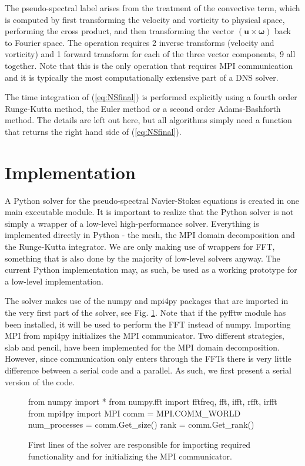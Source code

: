 \documentclass[11pt, oneside]{article}
\begin{document}
The pseudo-spectral label arises from the treatment of the convective term, which is computed by first transforming the velocity and vorticity to physical space, performing the cross product, and then transforming the vector ${(\bm{u}  \times  \bm{\omega})}$  back to Fourier space. The operation requires 2 inverse transforms (velocity and vorticity) and 1 forward transform for each of the three vector components, 9 all together. Note that this is the only operation that requires MPI communication and it is typically the most computationally extensive part of a DNS solver.

The time integration of (\ref{eq:NSfinal}) is performed explicitly using a fourth order Runge-Kutta method, the Euler method or a second order Adams-Bashforth method. The details are left out here, but all algorithms simply need a function that returns the right hand side of (\ref{eq:NSfinal}).

\section{Implementation}

A Python solver for the pseudo-spectral Navier-Stokes equations is created in one main executable module. It is important to realize that the Python solver is not simply a wrapper of a low-level high-performance solver. Everything is implemented directly in Python - the mesh, the MPI domain decomposition and the Runge-Kutta integrator. We are only making use of wrappers for FFT, something that is also done by the majority of low-level solvers anyway. The current Python implementation may, as such, be used as a working prototype for a low-level implementation.

The solver makes use of the numpy and mpi4py packages that are imported in the very first part of the solver, see Fig. \ref{fig:preample}. Note that if the pyfftw module has been installed, it will be used to perform the FFT instead of numpy. Importing MPI from mpi4py initializes the MPI communicator. Two different strategies, slab and pencil, have been implemented for the MPI domain decomposition. However, since communication only enters through the FFTs there is very little difference between a serial code and a parallel. As such, we first present a serial version of the code.

\begin{figure}[t!]
\begin{python}
from numpy import *
from numpy.fft import fftfreq, fft, ifft, rfft, irfft
from mpi4py import MPI
comm = MPI.COMM_WORLD
num_processes = comm.Get_size()
rank = comm.Get_rank()
\end{python}
\caption{First lines of the solver are responsible for importing required functionality and for initializing the MPI communicator.}
\label{fig:preample}
\end{figure}
\end{document}
